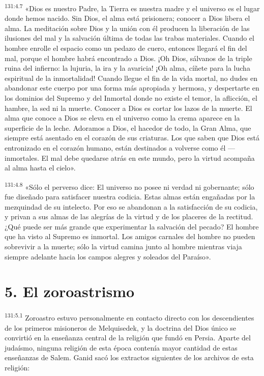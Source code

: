 \par 
\textsuperscript{131:4.7} «Dios es nuestro Padre, la Tierra es nuestra madre y el universo es el lugar donde hemos nacido. Sin Dios, el alma está prisionera; conocer a Dios libera el alma. La meditación sobre Dios y la unión con él producen la liberación de las ilusiones del mal y la salvación última de todas las trabas materiales. Cuando el hombre enrolle el espacio como un pedazo de cuero, entonces llegará el fin del mal, porque el hombre habrá encontrado a Dios. ¡Oh Dios, sálvanos de la triple ruina del infierno: la lujuria, la ira y la avaricia! ¡Oh alma, cíñete para la lucha espiritual de la inmortalidad! Cuando llegue el fin de la vida mortal, no dudes en abandonar este cuerpo por una forma más apropiada y hermosa, y despertarte en los dominios del Supremo y del Inmortal donde no existe el temor, la aflicción, el hambre, la sed ni la muerte. Conocer a Dios es cortar los lazos de la muerte. El alma que conoce a Dios se eleva en el universo como la crema aparece en la superficie de la leche. Adoramos a Dios, el hacedor de todo, la Gran Alma, que siempre está asentado en el corazón de sus criaturas. Los que saben que Dios está entronizado en el corazón humano, están destinados a volverse como él ---inmortales. El mal debe quedarse atrás en este mundo, pero la virtud acompaña al alma hasta el cielo».

\par 
\textsuperscript{131:4.8} «Sólo el perverso dice: El universo no posee ni verdad ni gobernante; sólo fue diseñado para satisfacer nuestra codicia. Estas almas están engañadas por la mezquindad de su intelecto. Por eso se abandonan a la satisfacción de su codicia, y privan a sus almas de las alegrías de la virtud y de los placeres de la rectitud. ¿Qué puede ser más grande que experimentar la salvación del pecado? El hombre que ha visto al Supremo es inmortal. Los amigos carnales del hombre no pueden sobrevivir a la muerte; sólo la virtud camina junto al hombre mientras viaja siempre adelante hacia los campos alegres y soleados del Paraíso».

\section*{5. El zoroastrismo}
\par 
\textsuperscript{131:5.1} Zoroastro estuvo personalmente en contacto directo con los descendientes de los primeros misioneros de Melquisedek, y la doctrina del Dios único se convirtió en la enseñanza central de la religión que fundó en Persia. Aparte del judaísmo, ninguna religión de esta época contenía mayor cantidad de estas enseñanzas de Salem. Ganid sacó los extractos siguientes de los archivos de esta religión:

